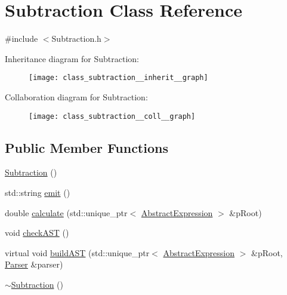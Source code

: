 \hypertarget{class_subtraction}{}\section{Subtraction Class Reference}
\label{class_subtraction}


{\ttfamily \#include $<$Subtraction.\+h$>$}



Inheritance diagram for Subtraction\+:
\nopagebreak
\begin{figure}[H]
\begin{center}
\leavevmode
\texttt{[image: class\_subtraction\_\_inherit\_\_graph]}
\end{center}
\end{figure}


Collaboration diagram for Subtraction\+:
\nopagebreak
\begin{figure}[H]
\begin{center}
\leavevmode
\texttt{[image: class\_subtraction\_\_coll\_\_graph]}
\end{center}
\end{figure}
\subsection*{Public Member Functions}
\begin{DoxyCompactItemize}
\item 
\mbox{\hyperlink{class_subtraction_a1c37c16ec1b7f7f89ec57bd749648e71}{Subtraction}} ()
\item 
std\+::string \mbox{\hyperlink{class_subtraction_a5371fb13392abe0c2b9fb05ca8bc7875}{emit}} ()
\item 
double \mbox{\hyperlink{class_subtraction_a45931b8ab5514a4517ac2533f50d5235}{calculate}} (std\+::unique\+\_\+ptr$<$ \mbox{\hyperlink{class_abstract_expression}{Abstract\+Expression}} $>$ \&p\+Root)
\item 
void \mbox{\hyperlink{class_subtraction_a0139d9c18eb7d87fc2f30ca4a6ea114e}{check\+A\+ST}} ()
\item 
virtual void \mbox{\hyperlink{class_subtraction_a3473b659f19e10c5898c44ef964a1369}{build\+A\+ST}} (std\+::unique\+\_\+ptr$<$ \mbox{\hyperlink{class_abstract_expression}{Abstract\+Expression}} $>$ \&p\+Root, \mbox{\hyperlink{class_parser}{Parser}} \&parser)
\item 
\mbox{\hyperlink{class_subtraction_a0fc403b3dc90ed529d032f84b7bc331c}{$\sim$\+Subtraction}} ()
\end{DoxyCompactItemize}
